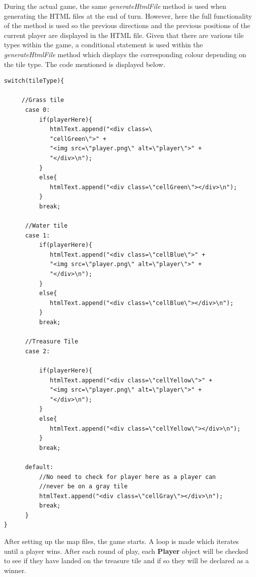 \documentclass[a4paper,12pt]{extarticle}
\begin{document}
\noindent During the actual game, the same \textit{generateHtmlFile} method is used when generating the HTML files at the end of turn. However, here the full functionality of the method is used so the previous directions and the previous positions of the current player are displayed in the HTML file. Given that there are various tile types within the game, a conditional statement is used within the \textit{generateHtmlFile} method which displays the corresponding colour depending on the tile type. The code mentioned is displayed below.

\begin{lstlisting}
switch(tileType){
     
     //Grass tile
      case 0:
          if(playerHere){
             htmlText.append("<div class=\
             "cellGreen\">" +
             "<img src=\"player.png\" alt=\"player\">" +
             "</div>\n");
          }
          else{
             htmlText.append("<div class=\"cellGreen\"></div>\n");
          }
          break;

      //Water tile
      case 1:
          if(playerHere){
             htmlText.append("<div class=\"cellBlue\">" +
             "<img src=\"player.png\" alt=\"player\">" +
             "</div>\n");
          }
          else{
             htmlText.append("<div class=\"cellBlue\"></div>\n");
          }
          break;

      //Treasure Tile
      case 2:

          if(playerHere){
             htmlText.append("<div class=\"cellYellow\">" +
             "<img src=\"player.png\" alt=\"player\">" +
             "</div>\n");
          }
          else{
             htmlText.append("<div class=\"cellYellow\"></div>\n");
          }
          break;

      default:
          //No need to check for player here as a player can 
          //never be on a gray tile
          htmlText.append("<div class=\"cellGray\"></div>\n");
          break;
      }
}

\end{lstlisting}
\vspace{4mm}

\noindent After setting up the map files, the game starts. A loop is made which iterates until a player wins. After each round of play, each \textbf{Player} object will be checked to see if they have landed on the treasure tile and if so they will be declared as a winner.\\
\end{document}
